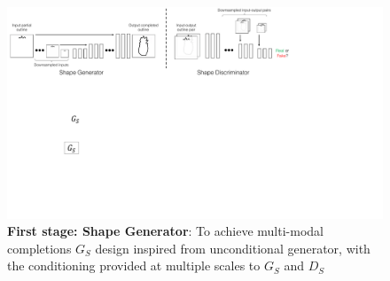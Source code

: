 
\begin{figure}[t]
    \centering
    \includegraphics[width=\linewidth]{paper_images/arch_shape.pdf}
    \caption{\textbf{First stage: Shape Generator}: To achieve multi-modal completions $G_S$ design inspired from unconditional generator, with the conditioning provided at multiple scales to $G_S$ and $D_S$
    }\label{fig:SketchNet}
\end{figure}

\label{sec:methods}




